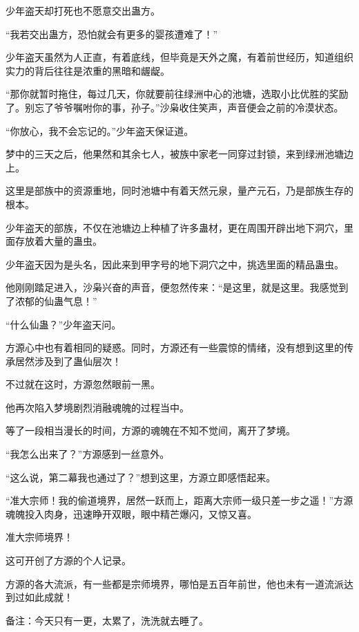 \begin{this_body}
少年盗天却打死也不愿意交出蛊方。

“我若交出蛊方，恐怕就会有更多的婴孩遭难了！”

少年盗天虽然为人正直，有着底线，但毕竟是天外之魔，有着前世经历，知道组织实力的背后往往是浓重的黑暗和龌龊。

“那你就暂时拖住，每过几天，你就要前往绿洲中心的池塘，选取小比优胜的奖励了。别忘了爷爷嘱咐你的事，孙子。”沙枭收住笑声，声音便会之前的冷漠状态。

“你放心，我不会忘记的。”少年盗天保证道。

梦中的三天之后，他果然和其余七人，被族中家老一同穿过封锁，来到绿洲池塘边上。

这里是部族中的资源重地，同时池塘中有着天然元泉，量产元石，乃是部族生存的根本。

少年盗天的部族，不仅在池塘边上种植了许多蛊材，更在周围开辟出地下洞穴，里面存放着大量的蛊虫。

少年盗天因为是头名，因此来到甲字号的地下洞穴之中，挑选里面的精品蛊虫。

他刚刚踏足进入，沙枭兴奋的声音，便忽然传来：“是这里，就是这里。我感觉到了浓郁的仙蛊气息！”

“什么仙蛊？”少年盗天问。

方源心中也有着相同的疑惑。同时，方源还有一些震惊的情绪，没有想到这里的传承居然涉及到了蛊仙层次！

不过就在这时，方源忽然眼前一黑。

他再次陷入梦境剧烈消融魂魄的过程当中。

等了一段相当漫长的时间，方源的魂魄在不知不觉间，离开了梦境。

“我怎么出来了？”方源感到一丝意外。

“这么说，第二幕我也通过了？”想到这里，方源立即感悟起来。

“准大宗师！我的偷道境界，居然一跃而上，距离大宗师一级只差一步之遥！”方源魂魄投入肉身，迅速睁开双眼，眼中精芒爆闪，又惊又喜。

准大宗师境界！

这可开创了方源的个人记录。

方源的各大流派，有一些都是宗师境界，哪怕是五百年前世，他也未有一道流派达到过如此成就！

备注：今天只有一更，太累了，洗洗就去睡了。

\end{this_body}


